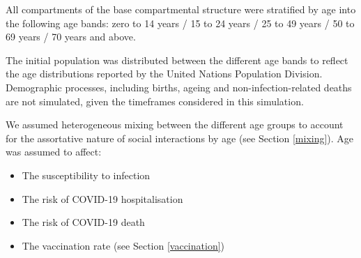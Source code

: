 All compartments of the base compartmental structure were stratified by age into the following age bands:
zero to 14 years / 15 to 24 years / 25 to 49 years / 50 to 69 years / 70 years and above.

The initial population was distributed between the different age bands to reflect the age distributions reported by the United Nations Population Division. Demographic processes, including births, ageing and non-infection-related deaths are not simulated, given the timeframes considered in this simulation.

We assumed heterogeneous mixing between the different age groups to account for the assortative nature of social interactions by age (see Section \ref{mixing}).
Age was assumed to affect:
\begin{itemize}
    \item The susceptibility to infection
    \item The risk of COVID-19 hospitalisation
    \item The risk of COVID-19 death
    \item The vaccination rate (see Section \ref{vaccination})
\end{itemize}